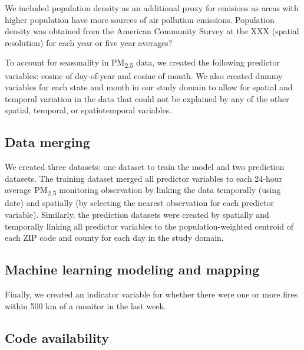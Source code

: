 \documentclass[english]{article}
\begin{document}
We included population density as an additional proxy for emisions as areas with higher population have more sources of air pollution emissions. Population density was obtained from the American Community Survey at the XXX (spatial resolution) for each year or five year averages? 

To account for seasonality in PM\textsubscript{2.5} data, we created the following predictor variables:  cosine of day-of-year and cosine of month. %
We also created dummy variables for each state and month in our study domain to allow for spatial and temporal variation in the data that could not be explained by any of the other spatial, temporal, or spatiotemporal variables. 

\subsection*{Data merging}
We created three datasets: one dataset to train the model and two prediction datasets. The training dataset merged all predictor variables to each 24-hour average PM\textsubscript{2.5} monitoring observation by linking the data temporally (using date) and spatially (by selecting the nearest observation for each predictor variable). Similarly, the prediction datasets were created by spatially and temporally linking all predictor variables to the population-weighted centroid of each ZIP code and county for each day in the study domain. 

\subsection*{Machine learning modeling and mapping}


Finally, we created an indicator variable for whether there were one or more fires within 500 km of a monitor in the last week. 

\subsection*{Code availability}
\end{document}
